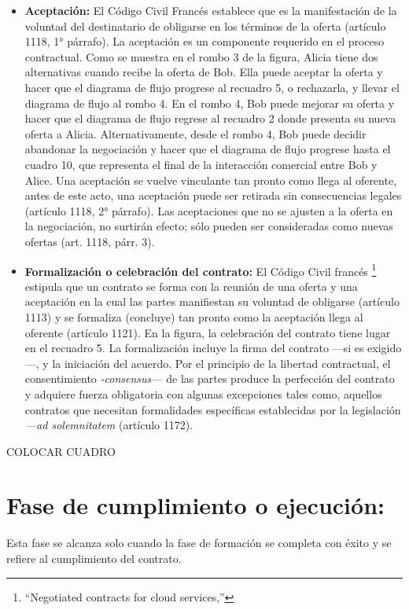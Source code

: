 \documentclass[12pt]{report} %
\begin{document}
\begin{itemize}
\begin{itemize}
    \item \textbf{Aceptación:} El Código Civil Francés establece que es la manifestación de la voluntad del destinatario de obligarse en los términos de la oferta (artículo 1118, 1° párrafo). La aceptación es un componente requerido en el proceso contractual. Como se muestra en el rombo 3 de la figura, Alicia tiene dos alternativas cuando recibe la oferta de Bob. Ella puede aceptar la oferta y hacer que el diagrama de flujo progrese al recuadro 5, o rechazarla, y llevar el diagrama de flujo al rombo 4. En el rombo 4, Bob puede mejorar su oferta y hacer que el diagrama de flujo regrese al recuadro 2 donde presenta su nueva oferta a Alicia. Alternativamente, desde el rombo 4, Bob puede decidir abandonar la negociación y hacer que el diagrama de flujo progrese hasta el cuadro 10, que representa el final de la interacción comercial entre Bob y Alice. Una aceptación se vuelve vinculante tan pronto como llega al oferente, antes de este acto, una aceptación puede ser retirada sin consecuencias legales (artículo 1118, 2° párrafo). Las aceptaciones que no se ajusten a la oferta en la negociación, no surtirán efecto; sólo pueden ser consideradas como nuevas ofertas (art. 1118, párr. 3).

    \item \textbf{Formalización o celebración del contrato: } El Código Civil francés \footnote{\cite{Millard2013}“Negotiated contracts for cloud services,” } estipula que un contrato se forma con la reunión de una oferta y una aceptación en la cual las partes manifiestan su voluntad de obligarse (artículo 1113) y se formaliza (concluye) tan pronto como la aceptación llega al oferente (artículo 1121). En la figura, la celebración del contrato tiene lugar en el recuadro 5. La formalización incluye la firma del contrato —si es exigido—, y la iniciación del acuerdo. Por el principio de la libertad contractual, el consentimiento \textit{-consensus— }de las partes produce la perfección del contrato y adquiere fuerza obligatoria con algunas excepciones tales como, aquellos contratos que necesitan formalidades específicas establecidas por la legislación \textit{—ad solemnitatem} (artículo 1172).
\end{itemize}



COLOCAR CUADRO


\section{Fase de cumplimiento o ejecución:} Esta fase se alcanza solo cuando la fase de formación se completa con éxito y se refiere al cumplimiento del contrato.


\end{itemize}
\end{document}
